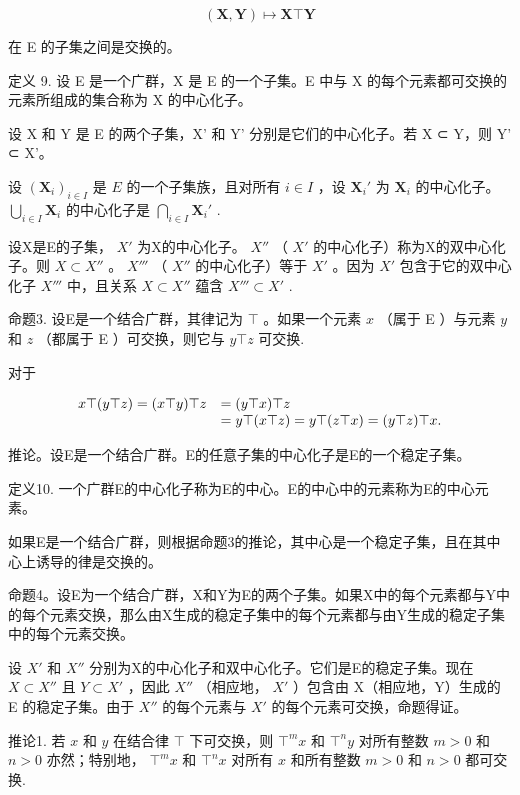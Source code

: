 \[
(\mathbf {X}, \mathbf {Y}) \mapsto \mathbf {X} \top \mathbf {Y}
\]

在 E 的子集之间是交换的。

定义 9. 设 E 是一个广群，X 是 E 的一个子集。E 中与 X 的每个元素都可交换的元素所组成的集合称为 X 的中心化子。

设 X 和 Y 是 E 的两个子集，X' 和 Y' 分别是它们的中心化子。若 X ⊂ Y，则 Y' ⊂ X'。

设 \((\mathbf{X}_i)_{i\in I}\) 是 \(E\) 的一个子集族，且对所有 \(i\in I\) ，设 \(\mathbf{X}_i'\) 为 \(\mathbf{X}_i\) 的中心化子。 \(\bigcup_{i\in I}\mathbf{X}_i\) 的中心化子是 \(\bigcap_{i\in I}\mathbf{X}_i'\) .

设X是E的子集， \(X'\) 为X的中心化子。 \(X''\) （ \(X'\) 的中心化子）称为X的双中心化子。则 \(X \subset X''\) 。 \(X'''\) （ \(X''\) 的中心化子）等于 \(X'\) 。因为 \(X'\) 包含于它的双中心化子 \(X'''\) 中，且关系 \(X \subset X''\) 蕴含 \(X''' \subset X'\) .

命题3. 设E是一个结合广群，其律记为 \(\top\) 。如果一个元素 \(x\) （属于 E ）与元素 \(y\) 和 \(z\) （都属于 E ）可交换，则它与 \(y \top z\) 可交换.

对于

\[
\begin{array}{r l} x \top (y \top z) = (x \top y) \top z & = (y \top x) \top z \\ & = y \top (x \top z) = y \top (z \top x) = (y \top z) \top x. \end{array}
\]

推论。设E是一个结合广群。E的任意子集的中心化子是E的一个稳定子集。

定义10. 一个广群E的中心化子称为E的中心。E的中心中的元素称为E的中心元素。

如果E是一个结合广群，则根据命题3的推论，其中心是一个稳定子集，且在其中心上诱导的律是交换的。

命题4。设E为一个结合广群，X和Y为E的两个子集。如果X中的每个元素都与Y中的每个元素交换，那么由X生成的稳定子集中的每个元素都与由Y生成的稳定子集中的每个元素交换。

设 \(X'\) 和 \(X''\) 分别为X的中心化子和双中心化子。它们是E的稳定子集。现在 \(X \subset X''\) 且 \(Y \subset X'\) ，因此 \(X''\) （相应地， \(X'\) ）包含由 X（相应地，Y）生成的 E 的稳定子集。由于 \(X''\) 的每个元素与 \(X'\) 的每个元素可交换，命题得证。

推论1. 若 \(x\) 和 \(y\) 在结合律 \(\top\) 下可交换，则 \(\top^m x\) 和 \(\top^n y\) 对所有整数 \(m > 0\) 和 \(n > 0\) 亦然；特别地， \(\top^m x\) 和 \(\top^n x\) 对所有 \(x\) 和所有整数 \(m > 0\) 和 \(n > 0\) 都可交换.

